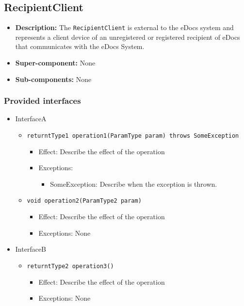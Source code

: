 \documentclass[a4paper,10pt]{article}
\begin{document}
\subsection{RecipientClient}
\begin{itemize}
    \item \textbf{Description:} The \texttt{RecipientClient} is external to the eDocs system and represents a client device of an unregistered or registered recipient of eDocs that communicates with the eDocs System.
    \item \textbf{Super-component:} None
    \item \textbf{Sub-components:} None
\end{itemize}

\subsubsection*{Provided interfaces}
\begin{itemize}
    \item InterfaceA
    \begin{itemize}
        \item \texttt{returntType1 operation1(ParamType param) throws SomeException}
        \begin{itemize}
            \item Effect: Describe the effect of the operation
            \item Exceptions:
            \begin{itemize}
                \item SomeException: Describe when the exception is thrown.
            \end{itemize}
		\end{itemize}
        \item \texttt{void operation2(ParamType2 param)}
        \begin{itemize}
            \item Effect: Describe the effect of the operation
            \item Exceptions: None
        \end{itemize}
    \end{itemize}

    \item InterfaceB
    \begin{itemize}
        \item \texttt{returntType2 operation3()}
        \begin{itemize}
            \item Effect: Describe the effect of the operation
            \item Exceptions: None
        \end{itemize}
    \end{itemize}
\end{itemize}
\end{document}
